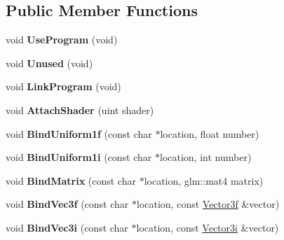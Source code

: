 \subsection*{Public Member Functions}
\begin{DoxyCompactItemize}
\item 
\hypertarget{classEngine_1_1Shader_a2ab3adc85f5ac7ed66669de0d5149ecf}{}void {\bfseries Use\+Program} (void)\label{classEngine_1_1Shader_a2ab3adc85f5ac7ed66669de0d5149ecf}

\item 
\hypertarget{classEngine_1_1Shader_a465a1bcbcefb47cda4715568891df59a}{}void {\bfseries Unused} (void)\label{classEngine_1_1Shader_a465a1bcbcefb47cda4715568891df59a}

\item 
\hypertarget{classEngine_1_1Shader_a42208d67fd98e68f945b7e26c7dbfbfb}{}void {\bfseries Link\+Program} (void)\label{classEngine_1_1Shader_a42208d67fd98e68f945b7e26c7dbfbfb}

\item 
\hypertarget{classEngine_1_1Shader_aac32f590f7f66dac5756bcc984e626c2}{}void {\bfseries Attach\+Shader} (uint shader)\label{classEngine_1_1Shader_aac32f590f7f66dac5756bcc984e626c2}

\item 
\hypertarget{classEngine_1_1Shader_a631c94b25466fce916cdfab0712809ef}{}void {\bfseries Bind\+Uniform1f} (const char $\ast$location, float number)\label{classEngine_1_1Shader_a631c94b25466fce916cdfab0712809ef}

\item 
\hypertarget{classEngine_1_1Shader_a866635c4c746bfb3dd1f4ce176871f0d}{}void {\bfseries Bind\+Uniform1i} (const char $\ast$location, int number)\label{classEngine_1_1Shader_a866635c4c746bfb3dd1f4ce176871f0d}

\item 
\hypertarget{classEngine_1_1Shader_a05147be1958f68d9eda10ff3bee24361}{}void {\bfseries Bind\+Matrix} (const char $\ast$location, glm\+::mat4 matrix)\label{classEngine_1_1Shader_a05147be1958f68d9eda10ff3bee24361}

\item 
\hypertarget{classEngine_1_1Shader_a0062df7c82a1be7bff14c8cb2010fde9}{}void {\bfseries Bind\+Vec3f} (const char $\ast$location, const \hyperlink{classVector3}{Vector3f} \&vector)\label{classEngine_1_1Shader_a0062df7c82a1be7bff14c8cb2010fde9}

\item 
\hypertarget{classEngine_1_1Shader_a565ae6adf7661c1da3acebbcee5ff97b}{}void {\bfseries Bind\+Vec3i} (const char $\ast$location, const \hyperlink{classVector3}{Vector3i} \&vector)\label{classEngine_1_1Shader_a565ae6adf7661c1da3acebbcee5ff97b}


\end{DoxyCompactItemize}
